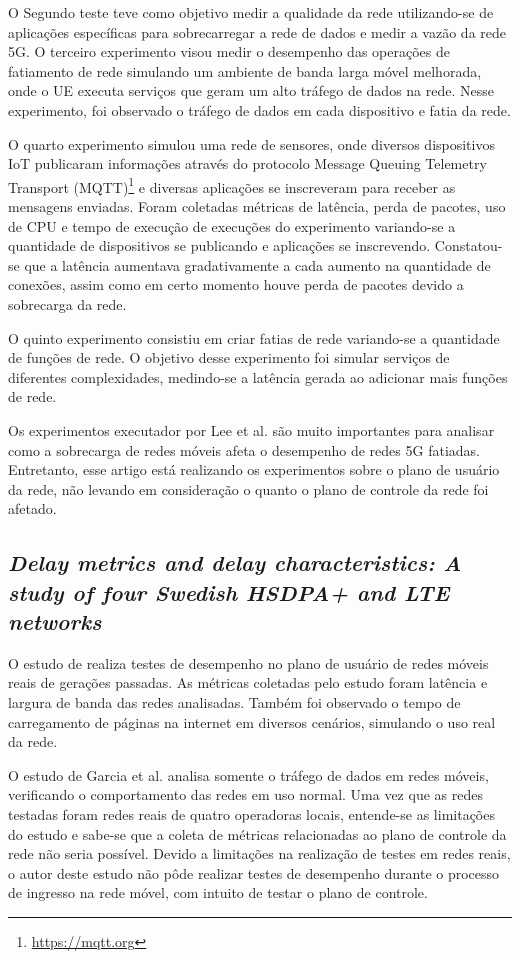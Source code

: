 O Segundo teste teve como objetivo medir a qualidade da rede utilizando-se de aplicações específicas para sobrecarregar a rede de dados e medir a vazão da rede 5G.
O terceiro experimento visou medir o desempenho das operações de fatiamento de rede simulando um ambiente de banda larga móvel melhorada, onde o UE executa serviços que geram um alto tráfego de dados na rede.
Nesse experimento, foi observado o tráfego de dados em cada dispositivo e fatia da rede.

O quarto experimento simulou uma rede de sensores, onde diversos dispositivos IoT publicaram informações através do protocolo Message Queuing Telemetry Transport (MQTT)\footnote{\url{https://mqtt.org}} e diversas aplicações se inscreveram para receber as mensagens enviadas.
Foram coletadas métricas de latência, perda de pacotes, uso de CPU e tempo de execução de execuções do experimento variando-se a quantidade de dispositivos se publicando e aplicações se inscrevendo.
Constatou-se que a latência aumentava gradativamente a cada aumento na quantidade de conexões, assim como em certo momento houve perda de pacotes devido a sobrecarga da rede.

O quinto experimento consistiu em criar fatias de rede variando-se a quantidade de funções de rede.
O objetivo desse experimento foi simular serviços de diferentes complexidades, medindo-se a latência gerada ao adicionar mais funções de rede.

Os experimentos executador por Lee et al. são muito importantes para analisar como a sobrecarga de redes móveis afeta o desempenho de redes 5G fatiadas.
Entretanto, esse artigo está realizando os experimentos sobre o plano de usuário da rede, não levando em consideração o quanto o plano de controle da rede foi afetado.

\subsection{\textit{Delay metrics and delay characteristics: A study of four Swedish HSDPA+ and LTE networks}}

O estudo de \cite{Garcia2015} realiza testes de desempenho no plano de usuário de redes móveis reais de gerações passadas.
As métricas coletadas pelo estudo foram latência e largura de banda das redes analisadas.
Também foi observado o tempo de carregamento de páginas na internet em diversos cenários, simulando o uso real da rede.

O estudo de Garcia et al. analisa somente o tráfego de dados em redes móveis, verificando o comportamento das redes em uso normal.
Uma vez que as redes testadas foram redes reais de quatro operadoras locais, entende-se as limitações do estudo e sabe-se que a coleta de métricas relacionadas ao plano de controle da rede não seria possível.
Devido a limitações na realização de testes em redes reais, o autor deste estudo não pôde realizar testes de desempenho durante o processo de ingresso na rede móvel, com intuito de testar o plano de controle.



